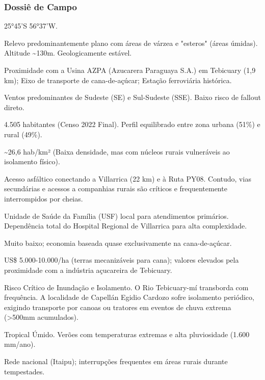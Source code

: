 \subsubsection{Dossiê de Campo}
\begin{description}[style=nextline,leftmargin=0.5cm,font=\bfseries]
\item[Coordenadas]  25°45'S 56°37'W.
\item[Topografia]  Relevo predominantemente plano com áreas de várzea e "esteros" (áreas úmidas). Altitude \textasciitilde 130m. Geologicamente estável.
\item[Alvos Estratégicos]  Proximidade com a Usina AZPA (Azucarera Paraguaya S.A.) em Tebicuary (1,9 km); Eixo de transporte de cana-de-açúcar; Estação ferroviária histórica.
\item[Fallout]  Ventos predominantes de Sudeste (SE) e Sul-Sudeste (SSE). Baixo risco de fallout direto.
\item[População]  4.505 habitantes (Censo 2022 Final). Perfil equilibrado entre zona urbana (51\%) e rural (49\%).
\item[Densidade]  \textasciitilde 26,6 hab/\allowbreak km² (Baixa densidade, mas com núcleos rurais vulneráveis ao isolamento físico).
\item[Vias de Acesso]  Acesso asfáltico conectando a Villarrica (22 km) e à Ruta PY08. Contudo, vias secundárias e acessos a companhias rurais são críticos e frequentemente interrompidos por cheias.
\item[Serviços]  Unidade de Saúde da Família (USF) local para atendimentos primários. Dependência total do Hospital Regional de Villarrica para alta complexidade.
\item[Custo de Vida]  Muito baixo; economia baseada quase exclusivamente na cana-de-açúcar.
\item[Preço da Terra]  US\$ 5.000-10.000/\allowbreak ha (terras mecanizáveis para cana); valores elevados pela proximidade com a indústria açucareira de Tebicuary.
\item[Hidrologia]  Risco Crítico de Inundação e Isolamento. O Rio Tebicuary-mí transborda com frequência. A localidade de Capellán Egidio Cardozo sofre isolamento periódico, exigindo transporte por canoas ou tratores em eventos de chuva extrema (>500mm acumulados).
\item[Clima]  Tropical Úmido. Verões com temperaturas extremas e alta pluviosidade (1.600 mm/\allowbreak ano).
\item[Energia]  Rede nacional (Itaipu); interrupções frequentes em áreas rurais durante tempestades.

\end{description}
